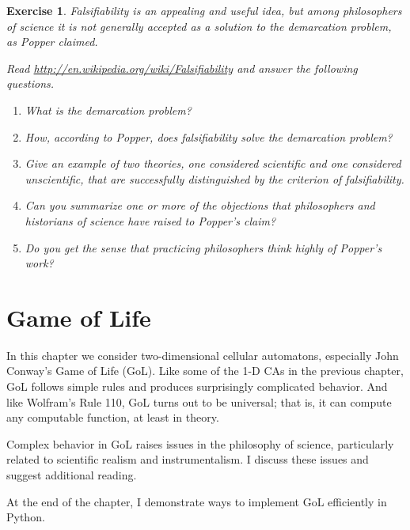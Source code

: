 \documentclass[12pt]{book}
\theoremstyle{exercise}
\newtheorem{exercise}{Exercise}[chapter]
\begin{document}
\begin{exercise}

Falsifiability is an appealing and useful idea, but among
philosophers of science it is not generally accepted
as a solution to the demarcation problem, as Popper claimed.

Read \url{http://en.wikipedia.org/wiki/Falsifiability} and answer the
following questions.

\begin{enumerate}

\item What is the demarcation problem?

\item How, according to Popper, does falsifiability solve the
demarcation problem?

\item Give an example of two theories, one considered scientific
and one considered unscientific, that are successfully distinguished
by the criterion of falsifiability.

\item Can you summarize one or more of the objections that
philosophers and historians of science have raised to Popper's
claim?

\item Do you get the sense that practicing philosophers think
highly of Popper's work?

\end{enumerate}

\end{exercise}




\chapter{Game of Life}
\label{lifechap}

In this chapter we consider two-dimensional cellular automatons,
especially John Conway's Game of Life (GoL).  Like some of
the 1-D CAs in the previous chapter, GoL follows simple rules and
produces surprisingly complicated behavior.  And like Wolfram's
Rule 110, GoL turns out to be universal; that is, it can compute
any computable function, at least in theory.

Complex behavior in GoL raises issues in the philosophy of
science, particularly related to scientific realism and instrumentalism.
I discuss these issues and suggest additional reading.

At the end of the chapter, I demonstrate ways to implement
GoL efficiently in Python.
\end{document}
